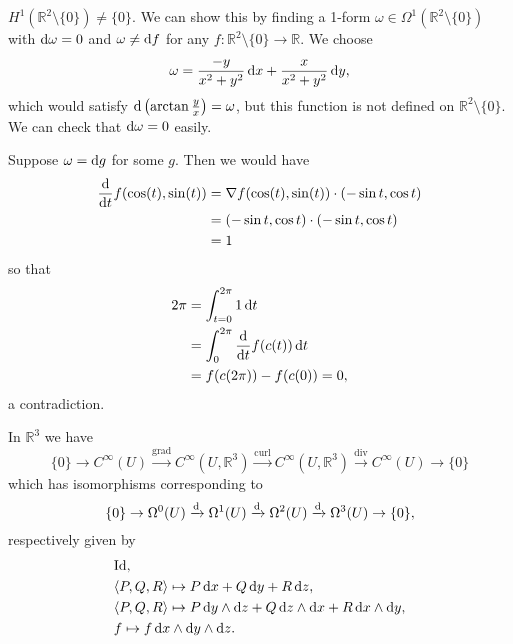 \begin{xmpl}
$H^1(\mathbb{R}^2 \setminus \{ 0 \}) \neq \{ 0 \}$.
We can show this by finding a 1-form
$\omega \in \Omega^1(\mathbb{R}^2 \setminus \{ 0 \})$
with $\mathop{}\!\mathrm{d} \omega = 0$ and $\omega \neq \mathop{}\!\mathrm{d} f$ for any
$f: \mathbb{R}^2 \setminus \{ 0 \} \to \mathbb{R}$. We choose
$$
  \omega
= \frac{-y}{x^2 + y^2} \mathop{}\!\mathrm{d} x
+ \frac{x}{x^2 + y^2} \mathop{}\!\mathrm{d} y,
$$
which would satisfy $\mathop{}\!\mathrm{d} \left(\arctan \frac{y}{x}\right) = \omega$,
but this function is not defined on $\mathbb{R}^2 \setminus \{ 0 \}$.
We can check that $\mathop{}\!\mathrm{d} \omega = 0$ easily.

Suppose $\omega = \mathop{}\!\mathrm{d} g$ for some $g$. Then we would have
\begin{align*}
   \frac{\mathop{}\!\mathrm{d}}{\mathop{}\!\mathrm{d} t}
     f(\cos(t), \sin(t))
&= \nabla f(\cos(t), \sin(t)) \cdot (-\sin t, \cos t) \\
&= (-\sin t, \cos t) \cdot (-\sin t, \cos t) \\
&= 1
\end{align*}
so that
\begin{align*}
   2\pi
&= \int_{t=0}^{2\pi}
     1 \mathop{}\!\mathrm{d} t \\
&= \int_{0}^{2\pi}
     \frac{\mathop{}\!\mathrm{d}}{\mathop{}\!\mathrm{d} t}
       f(c(t)) \mathop{}\!\mathrm{d} t \\
&= f(c(2\pi)) - f(c(0)) = 0,
\end{align*}
a contradiction.
\end{xmpl}

\begin{xmpl}
In $\mathbb{R}^3$ we have
$$
\{0\}                     \rightarrow
C^\infty(U)               \xrightarrow{\mathrm{grad}}
C^\infty(U, \mathbb{R}^3) \xrightarrow{\mathrm{curl}}
C^\infty(U, \mathbb{R}^3) \xrightarrow{\mathrm{div}}
C^\infty(U)               \rightarrow
\{0\}
$$
which has isomorphisms corresponding to
$$
\{0\}       \rightarrow
\Omega^0(U) \xrightarrow{\mathop{}\!\mathrm{d}}
\Omega^1(U) \xrightarrow{\mathop{}\!\mathrm{d}}
\Omega^2(U) \xrightarrow{\mathop{}\!\mathrm{d}}
\Omega^3(U) \rightarrow
\{0\},
$$
respectively given by
\begin{align*}
& \mathrm{Id}, \\
& \langle P, Q, R \rangle
    \mapsto P \dif x + Q \dif y + R \dif z, \\
& \langle P, Q, R \rangle
    \mapsto P \dif y \wedge \dif z
          + Q \dif z \wedge \dif x
          + R \dif x \wedge \dif y, \\
& f \mapsto f \dif x \wedge \dif y \wedge \dif z.
\end{align*}
\end{xmpl}
